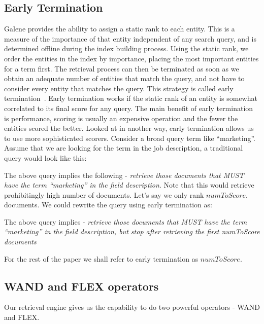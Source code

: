 \subsection{Early Termination}
Galene provides the ability to assign a static rank to each entity.  This is a measure of the importance of that 
entity independent of any search query, and is determined offline during the index building process.  
Using the static rank, we order the entities in the index by importance, placing the most important entities for a term first.  
The retrieval process can then be terminated as soon as we obtain an adequate number of entities that match the query, 
and not have to consider every entity that matches the query.  This strategy is called 
early termination~\cite{anh2001vector,yan2010efficient,zhang2010revisiting}.
Early termination works if the static rank of an entity is somewhat correlated to its final score for any query.  
The main benefit of early termination is performance, scoring is usually an expensive operation and the fewer the entities scored the better.  
Looked at in another way, early termination allows us to use more sophisticated scorers. Consider a broad query term like ``marketing''. 
Assume that we are looking for the term in the job description, a traditional
query would look like this: 


The above query implies the following - {\it retrieve those documents that MUST
have the term ``marketing'' in the field description}. Note that this would
retrieve prohibitingly high number of documents. Let's say we only rank
$numToScore$.
documents. We could rewrite the query using early termination as:


The above query implies - {\it retrieve those documents that MUST
have the term ``marketing'' in the field description, but stop after retrieving
the first numToScore documents}

For the rest of the paper we shall refer to early termination as $numToScore$. 

\subsection{WAND and FLEX operators} \label{sec:wand}

Our retrieval engine gives us the capability to do two powerful operators -
WAND and FLEX.

